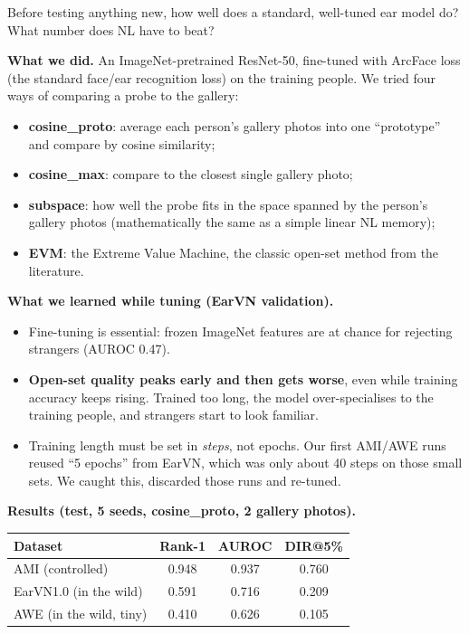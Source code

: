 \documentclass[11pt,a4paper]{article}
\begin{document}
\begin{question}
Before testing anything new, how well does a standard, well-tuned ear model do? What number does NL have to beat?
\end{question}

\textbf{What we did.} An ImageNet-pretrained ResNet-50, fine-tuned with ArcFace loss (the standard face/ear recognition loss) on the training people. We tried four ways of comparing a probe to the gallery:
\begin{itemize}
  \item \textbf{cosine\_proto}: average each person's gallery photos into one ``prototype'' and compare by cosine similarity;
  \item \textbf{cosine\_max}: compare to the closest single gallery photo;
  \item \textbf{subspace}: how well the probe fits in the space spanned by the person's gallery photos (mathematically the same as a simple linear NL memory);
  \item \textbf{EVM}: the Extreme Value Machine, the classic open-set method from the literature.
\end{itemize}

\textbf{What we learned while tuning (EarVN validation).}
\begin{itemize}
  \item Fine-tuning is essential: frozen ImageNet features are at chance for rejecting strangers (AUROC 0.47).
  \item \textbf{Open-set quality peaks early and then gets worse}, even while training accuracy keeps rising. Trained too long, the model over-specialises to the training people, and strangers start to look familiar.
  \item Training length must be set in \emph{steps}, not epochs. Our first AMI/AWE runs reused ``5 epochs'' from EarVN, which was only about 40 steps on those small sets. We caught this, discarded those runs and re-tuned.
\end{itemize}

\textbf{Results (test, 5 seeds, cosine\_proto, 2 gallery photos).}
\begin{center}
\begin{tabular}{@{}lccc@{}}
\toprule
\textbf{Dataset} & \textbf{Rank-1} & \textbf{AUROC} & \textbf{DIR@5\%}\\
\midrule
AMI (controlled) & 0.948 & 0.937 & 0.760\\
EarVN1.0 (in the wild) & 0.591 & 0.716 & 0.209\\
AWE (in the wild, tiny) & 0.410 & 0.626 & 0.105\\
\bottomrule
\end{tabular}
\end{center}
\end{document}
